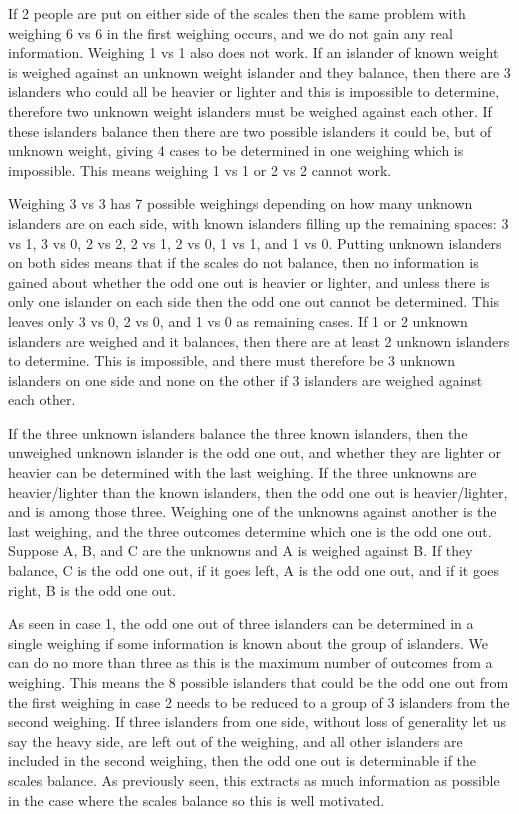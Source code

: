If 2 people are put on either side of the scales then the same problem with weighing 6 vs 6 in the first weighing occurs, and we do not gain any real information. Weighing 1 vs 1 also does not work. If an islander of known weight is weighed against an unknown weight islander and they balance, then there are 3 islanders who could all be heavier or lighter and this is impossible to determine, therefore two unknown weight islanders must be weighed against each other. If these islanders balance then there are two possible islanders it could be, but of unknown weight, giving 4 cases to be determined in one weighing which is impossible. This means weighing 1 vs 1 or 2 vs 2 cannot work.

Weighing 3 vs 3 has 7 possible weighings depending on how many unknown islanders are on each side, with known islanders filling up the remaining spaces: 3 vs 1, 3 vs 0, 2 vs 2, 2 vs 1, 2 vs 0, 1 vs 1, and 1 vs 0. Putting unknown islanders on both sides means that if the scales do not balance, then no information is gained about whether the odd one out is heavier or lighter, and unless there is only one islander on each side then the odd one out cannot be determined. This leaves only 3 vs 0, 2 vs 0, and 1 vs 0 as remaining cases. If 1 or 2 unknown islanders are weighed and it balances, then there are at least 2 unknown islanders to determine. This is impossible, and there must therefore be 3 unknown islanders on one side and none on the other if 3 islanders are weighed against each other.

If the three unknown islanders balance the three known islanders, then the unweighed unknown islander is the odd one out, and whether they are lighter or heavier can be determined with the last weighing. If the three unknowns are heavier/lighter than the known islanders, then the odd one out is heavier/lighter, and is among those three. Weighing one of the unknowns against another is the last weighing, and the three outcomes determine which one is the odd one out. Suppose A, B, and C are the unknowns and A is weighed against B. If they balance, C is the odd one out, if it goes left, A is the odd one out, and if it goes right, B is the odd one out.

As seen in case 1, the odd one out of three islanders can be determined in a single weighing if some information is known about the group of islanders. We can do no more than three as this is the maximum number of outcomes from a weighing. This means the 8 possible islanders that could be the odd one out from the first weighing in case 2 needs to be reduced to a group of 3 islanders from the second weighing. If three islanders from one side, without loss of generality let us say the heavy side, are left out of the weighing, and all other islanders are included in the second weighing, then the odd one out is determinable if the scales balance. As previously seen, this extracts as much information as possible in the case where the scales balance so this is well motivated.

